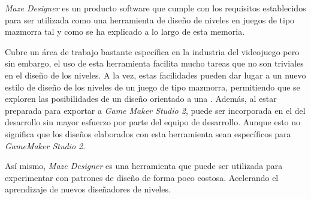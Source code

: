 \textit{Maze Designer} es un producto software que cumple con los requisitos establecidos para ser utilizada como una herramienta de diseño de niveles en juegos de tipo mazmorra tal y como se ha explicado a lo largo de esta memoria.

Cubre un área de trabajo bastante específica en la industria del videojuego pero sin embargo, el uso de esta herramienta facilita mucho tareas que no son triviales en el diseño de los niveles. A la vez, estas facilidades pueden dar lugar a un nuevo estilo de diseño de los niveles de un juego de tipo mazmorra, permitiendo que se exploren las posibilidades de un diseño orientado a una .
Además, al estar preparada para exportar a \textit{Game Maker Studio 2}, puede ser incorporada en el  del desarrollo sin mayor esfuerzo por parte del equipo de desarrollo. Aunque esto no significa que los diseños elaborados con esta herramienta sean específicos para \textit{GameMaker Studio 2}.

Así mismo, \textit{Maze Designer} es una herramienta que puede ser utilizada para experimentar con patrones de diseño de forma poco costosa. Acelerando el aprendizaje de nuevos diseñadores de niveles.